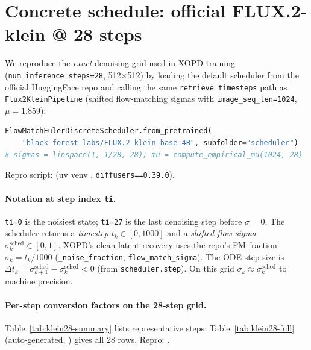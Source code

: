\documentclass[11pt,a4paper]{article}
\begin{document}
\section{Concrete schedule: official FLUX.2-klein @ 28 steps}
\label{sec:schedule}

We reproduce the \emph{exact} denoising grid used in XOPD training
(\texttt{num\_inference\_steps=28}, 512$\times$512) by loading the default scheduler from the
official HuggingFace repo and calling the same \texttt{retrieve\_timesteps} path as
\texttt{Flux2KleinPipeline} (shifted flow-matching sigmas with
\texttt{image\_seq\_len=1024}, $\mu=1.859$):
\begin{lstlisting}[language=Python,basicstyle=\ttfamily\footnotesize,frame=none]
FlowMatchEulerDiscreteScheduler.from_pretrained(
    "black-forest-labs/FLUX.2-klein-base-4B", subfolder="scheduler")
# sigmas = linspace(1, 1/28, 28); mu = compute_empirical_mu(1024, 28)
\end{lstlisting}
Repro script:  (uv venv
, \texttt{diffusers==0.39.0}).

\paragraph{Notation at step index \texttt{ti}.}
\texttt{ti=0} is the noisiest state; \texttt{ti=27} is the last denoising step before $\sigma=0$.
The scheduler returns a \emph{timestep} $t_k\in[0,1000]$ and a \emph{shifted flow sigma}
$\sigma^{\mathrm{sched}}_k\in[0,1]$. XOPD's clean-latent recovery uses the repo's FM fraction
$\sigma_k=t_k/1000$ (\texttt{\_noise\_fraction}, \texttt{flow\_match\_sigma}). The ODE step size is
$\Delta t_k=\sigma^{\mathrm{sched}}_{k+1}-\sigma^{\mathrm{sched}}_k<0$ (from
\texttt{scheduler.step}). On this grid $\sigma_k\approx\sigma^{\mathrm{sched}}_k$ to machine
precision.

\paragraph{Per-step conversion factors on the 28-step grid.}
Table~\ref{tab:klein28-summary} lists representative steps; Table~\ref{tab:klein28-full}
(auto-generated, )
gives all 28 rows. Repro: .
\end{document}
